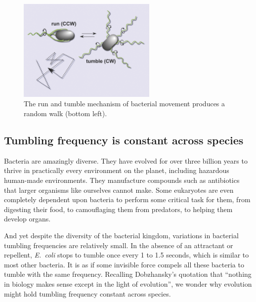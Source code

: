 \begin{figure}[h]
\centering
\mySfFamily
\includegraphics[width = 0.6\textwidth]{../images_CMYK/chemotaxis_intro_runtumble}
\caption{The run and tumble mechanism of bacterial movement produces a random walk (bottom left).}
\label{fig:chemotaxis_intro_runtumble}
\end{figure}

\begin{qbox}\end{qbox}

\FloatBarrier
{}
\subsection{Tumbling frequency is constant across species}

Bacteria are amazingly diverse. They have evolved for over three billion years to thrive in practically every environment on the planet, including hazardous human-made environments. They manufacture compounds such as antibiotics that larger organisms like ourselves cannot make. Some eukaryotes are even completely dependent upon bacteria to perform some critical task for them, from digesting their food, to camouflaging them from predators, to helping them develop organs.

And yet despite the diversity of the bacterial kingdom, variations in bacterial tumbling frequencies are relatively small. In the absence of an attractant or repellent, \textit{E.~coli} stops to tumble once every 1 to 1.5 seconds, which is similar to most other bacteria. It is as if some invisible force compels all these bacteria to tumble with the same frequency. Recalling Dobzhansky's quotation that ``nothing in biology makes sense except in the light of evolution'', we wonder why evolution might hold tumbling frequency constant across species.

